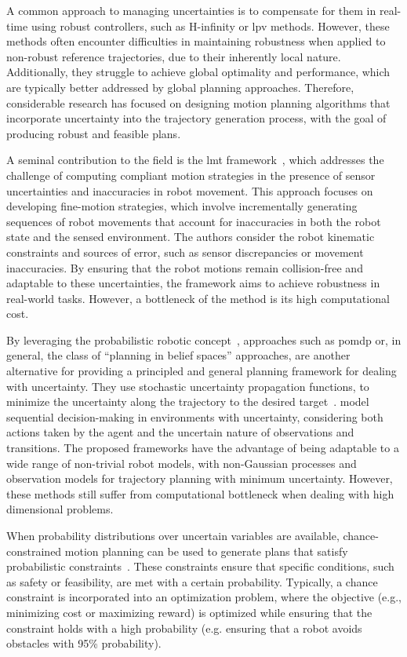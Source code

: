 A common approach to managing uncertainties is to compensate for them in real-time using robust controllers, such as H-infinity or \gls{lpv} methods.
However, these methods often encounter difficulties in maintaining robustness when applied to non-robust reference trajectories, due to their inherently local nature.
Additionally, they struggle to achieve global optimality and performance, which are typically better addressed by global planning approaches.
Therefore, considerable research has focused on designing motion planning algorithms that incorporate uncertainty into the trajectory generation process, with the goal of producing robust and feasible plans.

A seminal contribution to the field is the \gls{lmt} framework~\cite{cLMT}, which addresses the challenge of computing compliant motion strategies in the presence of sensor uncertainties and inaccuracies in robot movement. 
This approach focuses on developing fine-motion strategies, which involve incrementally generating sequences of robot movements that account for inaccuracies in both the robot state and the sensed environment. 
The authors consider the robot kinematic constraints and sources of error, such as sensor discrepancies or movement inaccuracies.
By ensuring that the robot motions remain collision-free and adaptable to these uncertainties, the framework aims to achieve robustness in real-world tasks.
However, a bottleneck of the method is its high computational cost.

By leveraging the probabilistic robotic concept~\cite{cProbaRobotic}, approaches such as \gls{pomdp} or, in general, the class of “planning in belief spaces” approaches, are another alternative for providing a principled and general planning framework for dealing with uncertainty.
They use stochastic uncertainty propagation functions, to minimize the uncertainty along the trajectory to the desired target~\cite{cUncertaintyPOMDP,cNavigationPOMPDP}. 
 model sequential decision-making in environments with uncertainty, considering both actions taken by the agent and the uncertain nature of observations and transitions.
The proposed frameworks have the advantage of being adaptable to a wide range of non-trivial robot models, with non-Gaussian processes and observation models for trajectory planning with minimum uncertainty.
However, these methods still suffer from computational bottleneck when dealing with high dimensional problems.

When probability distributions over uncertain variables are available, chance-constrained motion planning can be used to generate plans that satisfy probabilistic constraints~\cite{cChance1,cChance2,cChance3}. 
These constraints ensure that specific conditions, such as safety or feasibility, are met with a certain probability. 
Typically, a chance constraint is incorporated into an optimization problem, where the objective (e.g., minimizing cost or maximizing reward) is optimized while ensuring that the constraint holds with a high probability (e.g. ensuring that a robot avoids obstacles with 95\% probability).

